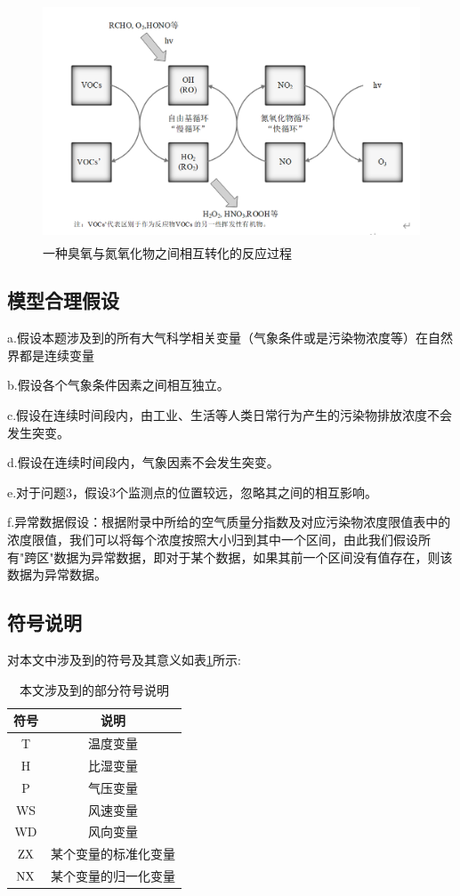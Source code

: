 \documentclass[bwprint]{gmcmthesis}
\numberwithin{figure}{section}
\newcommand{\upcite}[1]{\textsuperscript{\textsuperscript{\cite{#1}}}}
\begin{document}
\begin{figure}[!h]
	\centering
	\includegraphics[width=.7\textwidth]{figures//fig2-1.png}
	\caption{一种臭氧与氮氧化物之间相互转化的反应过程\upcite{ref5}}
	\label{fig2-1}
\end{figure}

\subsection{模型合理假设}
a.假设本题涉及到的所有大气科学相关变量（气象条件或是污染物浓度等）在自然界都是连续变量

b.假设各个气象条件因素之间相互独立。

c.假设在连续时间段内，由工业、生活等人类日常行为产生的污染物排放浓度不会发生突变。

d.假设在连续时间段内，气象因素不会发生突变。

e.对于问题3，假设3个监测点的位置较远，忽略其之间的相互影响。

f.异常数据假设：根据附录中所给的空气质量分指数及对应污染物浓度限值表中的浓度限值，我们可以将每个浓度按照大小归到其中一个区间，由此我们假设所有"跨区"数据为异常数据，即对于某个数据，如果其前一个区间没有值存在，则该数据为异常数据。
\subsection{符号说明}
对本文中涉及到的符号及其意义如表\ref{tab:table2-1}所示:
\begin{table}[h!]
	\caption{本文涉及到的部分符号说明}\label{tab:table2-1}
	\begin{center}
		\begin{tabular}{|c|c|}
			\hline
			符号&说明\\
			\hline
			T&温度变量\\
			H&比湿变量\\
			P&气压变量\\
			WS&风速变量\\
			WD&风向变量\\
			$\rm ZX$&某个变量的标准化变量\\
			$\rm NX$&某个变量的归一化变量\\
			\hline
		\end{tabular}
	\end{center}
\end{table}
\end{document}
